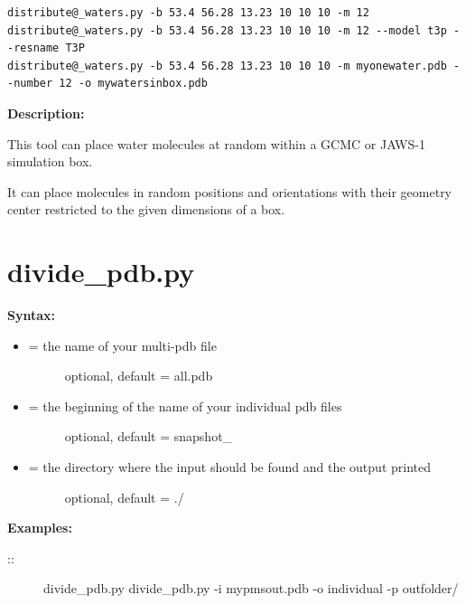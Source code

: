 \documentclass[letterpaper,10pt,english]{manual}
\begin{document}
\begin{Verbatim}[commandchars=@\[\]]
distribute@_waters.py -b 53.4 56.28 13.23 10 10 10 -m 12
distribute@_waters.py -b 53.4 56.28 13.23 10 10 10 -m 12 --model t3p --resname T3P
distribute@_waters.py -b 53.4 56.28 13.23 10 10 10 -m myonewater.pdb --number 12 -o mywatersinbox.pdb
\end{Verbatim}

\textbf{Description:}

This tool can place water molecules at random within a GCMC or JAWS-1 simulation box.

It can place molecules in random positions and orientations with their geometry center restricted to the given dimensions of a box.


\section{divide\_pdb.py}

\textbf{Syntax:}

\begin{itemize}
\item {} \begin{description}
\item[{ = the name of your multi-pdb file}] \leavevmode
optional, default = all.pdb

\end{description}

\item {} \begin{description}
\item[{ = the beginning of the name of your individual pdb files}] \leavevmode
optional, default = snapshot\_

\end{description}

\item {} \begin{description}
\item[{ = the directory where the input should be found and the output printed}] \leavevmode
optional, default = ./

\end{description}

\end{itemize}

\textbf{Examples:}
\begin{description}
\item[{::}] \leavevmode
divide\_pdb.py
divide\_pdb.py -i mypmsout.pdb -o individual -p outfolder/

\end{description}
\end{document}
